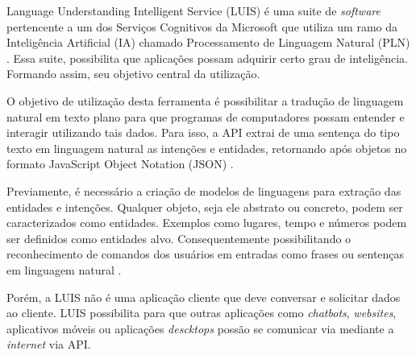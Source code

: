 Language Understanding Intelligent Service (LUIS) é uma suite de \textit{software} pertencente a um dos Serviços Cognitivos da Microsoft que utiliza um ramo da Inteligência Artificial (IA) chamado Processamento de Linguagem Natural (PLN) \cite{Mayo:2017}. Essa suite, possibilita que aplicações possam adquirir certo grau de inteligência. Formando assim, seu objetivo central da utilização.

O objetivo de utilização desta ferramenta é possibilitar a tradução de linguagem natural em texto plano para que programas de computadores possam entender e interagir utilizando tais dados. Para isso, a API extrai de uma sentença do tipo texto em linguagem natural as intenções e entidades, retornando após objetos no formato JavaScript Object Notation (JSON) \cite{Mayo:2017}.

Previamente, é necessário a criação de modelos de linguagens para extração das entidades e intenções. Qualquer objeto, seja ele abstrato ou concreto, podem ser caracterizados como entidades. Exemplos como lugares, tempo e números podem ser definidos como entidades alvo. Consequentemente possibilitando o reconhecimento de comandos dos usuários em entradas como frases ou sentenças em linguagem natural \cite{Larsen:2017}.

Porém, a LUIS não é uma aplicação cliente que deve conversar e solicitar dados ao cliente. LUIS possibilita para que outras aplicações como \textit{chatbots}, \textit{websites}, aplicativos móveis ou aplicações \textit{descktops} possão se comunicar via mediante a \textit{internet} via API.
